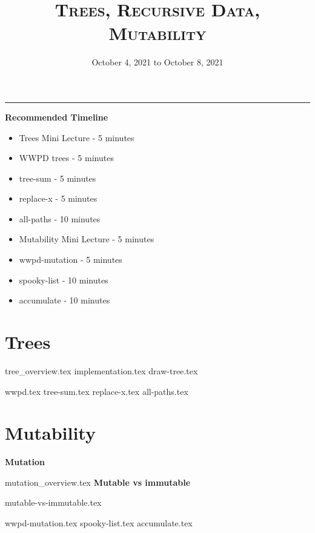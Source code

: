 \documentclass{exam}
\title{\textsc{Trees, Recursive Data, Mutability}}
\date{October 4, 2021 to October 8, 2021}
\begin{document}
	\maketitle
	\rule{\textwidth}{0.15em}
	\fontsize{12}{15}\selectfont

\begin{guide}
	\textbf{Recommended Timeline}
	\begin{itemize}
		\item Trees Mini Lecture - 5 minutes
		\item WWPD trees - 5 minutes
		\item tree-sum - 5 minutes
		\item replace-x - 5 minutes
		\item all-paths - 10 minutes
		\item Mutability Mini Lecture - 5 minutes
		\item wwpd-mutation - 5 minutes
		\item spooky-list - 10 minutes
		\item accumulate - 10 minutes
	\end{itemize}
\end{guide}

\section{Trees}
	{tree_overview.tex}
	{implementation.tex}
	{draw-tree.tex}
	\begin{questions}
		{wwpd.tex}
		\newpage
		{tree-sum.tex}
		\newpage
		{replace-x.tex}
		\newpage
		{all-paths.tex}
	\end{questions}	
\newpage
\section{Mutability}
	\textbf{Mutation}

	{mutation_overview.tex}
	\textbf{Mutable vs immutable}

	{mutable-vs-immutable.tex}
	\begin{questions}
		{wwpd-mutation.tex}
		\newpage
		{spooky-list.tex}
		\newpage
		{accumulate.tex}
	\end{questions}
\end{document}
